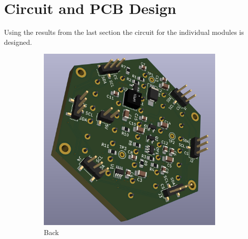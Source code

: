 \chapter{Circuit and PCB Design}
%
Using the results from the last section the circuit for the individual modules is designed.
%




%
\begin{figure}[ht]
  \begin{subfigure}[b]{0.49\textwidth}
    \includegraphics[width=\textwidth]{src/assets/pictures/circuit/pcb_back.png}
    \caption{Back}
    \label{fig:pcb:back}
  \end{subfigure}
  \hfill
  \begin{subfigure}[b]{0.49\textwidth}

\end{subfigure}
\end{figure}
